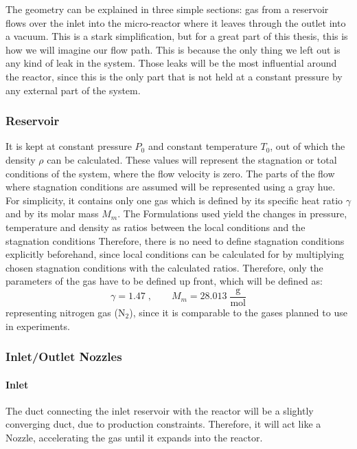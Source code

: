 	The geometry can be explained in three simple sections: gas from a reservoir flows over the inlet into the micro-reactor where it leaves through the outlet into a vacuum. 
	This is a stark simplification, but for a great part of this thesis, this is how we will imagine our flow path.
	This is because the only thing we left out is any kind of leak in the system.
	Those leaks will be the most influential around the reactor, since this is the only part that is not held at a constant pressure by any external part of the system.\\

\subsubsection*{Reservoir}
	It is kept at constant pressure $P_0$ and constant temperature $T_0$, out of which the density $\rho$ can be calculated.
	These values will represent the stagnation or total conditions of the system, where the flow velocity is zero. The parts of the flow where stagnation conditions are assumed will be represented using a gray hue.
	For simplicity, it contains only one gas which is defined by its specific heat ratio $\gamma$ and by its molar mass $M_m$.
	The Formulations used yield the changes in pressure, temperature and density as ratios between the local conditions and the stagnation conditions
	Therefore, there is no need to define stagnation conditions explicitly beforehand, since local conditions can be calculated for by multiplying chosen stagnation conditions with the calculated ratios.
	Therefore, only the parameters of the gas have to be defined up front, which will be defined as:
	$$
		\gamma = 1.47\;, \qquad M_m = 28.013\; \frac{\text{g}}{\text{mol}}
	$$
	representing nitrogen gas ($\text{N}_2$), since it is comparable to the gases planned to use in experiments.
	\newpage

\subsubsection*{Inlet/Outlet Nozzles}
	\paragraph{Inlet}
		The duct connecting the inlet reservoir with the reactor will be a slightly converging duct, due to production constraints.
		Therefore, it will act like a Nozzle, accelerating the gas until it expands into the reactor.
	
